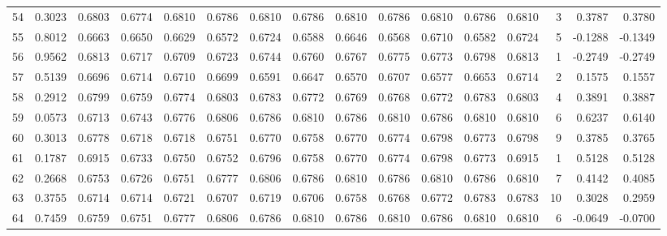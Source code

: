 \begin{tabular}{lrrrrrrrrrrrrrrr}
54  &      0.3023 &  0.6803 &  0.6774 &  0.6810 &  0.6786 &  0.6810 &  0.6786 &  0.6810 &  0.6786 &  0.6810 &   0.6786 &     0.6810 &      3 &                    0.3787 &                     0.3780 \\
55  &      0.8012 &  0.6663 &  0.6650 &  0.6629 &  0.6572 &  0.6724 &  0.6588 &  0.6646 &  0.6568 &  0.6710 &   0.6582 &     0.6724 &      5 &                   -0.1288 &                    -0.1349 \\
56  &      0.9562 &  0.6813 &  0.6717 &  0.6709 &  0.6723 &  0.6744 &  0.6760 &  0.6767 &  0.6775 &  0.6773 &   0.6798 &     0.6813 &      1 &                   -0.2749 &                    -0.2749 \\
57  &      0.5139 &  0.6696 &  0.6714 &  0.6710 &  0.6699 &  0.6591 &  0.6647 &  0.6570 &  0.6707 &  0.6577 &   0.6653 &     0.6714 &      2 &                    0.1575 &                     0.1557 \\
58  &      0.2912 &  0.6799 &  0.6759 &  0.6774 &  0.6803 &  0.6783 &  0.6772 &  0.6769 &  0.6768 &  0.6772 &   0.6783 &     0.6803 &      4 &                    0.3891 &                     0.3887 \\
59  &      0.0573 &  0.6713 &  0.6743 &  0.6776 &  0.6806 &  0.6786 &  0.6810 &  0.6786 &  0.6810 &  0.6786 &   0.6810 &     0.6810 &      6 &                    0.6237 &                     0.6140 \\
60  &      0.3013 &  0.6778 &  0.6718 &  0.6718 &  0.6751 &  0.6770 &  0.6758 &  0.6770 &  0.6774 &  0.6798 &   0.6773 &     0.6798 &      9 &                    0.3785 &                     0.3765 \\
61  &      0.1787 &  0.6915 &  0.6733 &  0.6750 &  0.6752 &  0.6796 &  0.6758 &  0.6770 &  0.6774 &  0.6798 &   0.6773 &     0.6915 &      1 &                    0.5128 &                     0.5128 \\
62  &      0.2668 &  0.6753 &  0.6726 &  0.6751 &  0.6777 &  0.6806 &  0.6786 &  0.6810 &  0.6786 &  0.6810 &   0.6786 &     0.6810 &      7 &                    0.4142 &                     0.4085 \\
63  &      0.3755 &  0.6714 &  0.6714 &  0.6721 &  0.6707 &  0.6719 &  0.6706 &  0.6758 &  0.6768 &  0.6772 &   0.6783 &     0.6783 &     10 &                    0.3028 &                     0.2959 \\
64  &      0.7459 &  0.6759 &  0.6751 &  0.6777 &  0.6806 &  0.6786 &  0.6810 &  0.6786 &  0.6810 &  0.6786 &   0.6810 &     0.6810 &      6 &                   -0.0649 &                    -0.0700 \\

\end{tabular}
